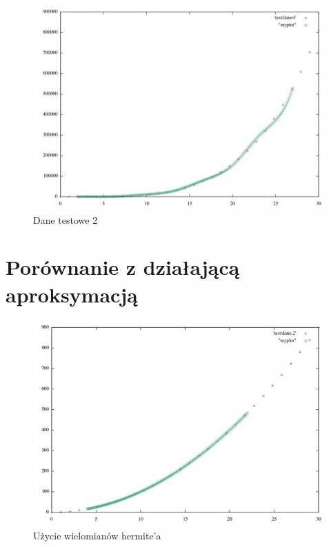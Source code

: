 \documentclass[10pt, a4paper]{report}
\begin{document}
    \begin{figure}[h]
        \begin{center}
            \includegraphics[scale=0.8]{test2.jpg}
            \caption{Dane testowe 2}
        \end{center}
    \end{figure}
    \newpage

    \section{Porównanie z działającą aproksymacją}
    \begin{figure}[h]
        \begin{center}
            \includegraphics[scale=0.6]{compare1.jpg}
            \caption{Użycie wielomianów hermite'a}
        \end{center}
    \end{figure}
\end{document}
